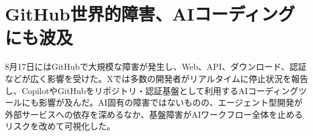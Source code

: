 \section{GitHub世界的障害、AIコーディングにも波及}
8月17日にはGitHubで大規模な障害が発生し、Web、API、ダウンロード、認証などが広く影響を受けた。Xでは多数の開発者がリアルタイムに停止状況を報告し、CopilotやGitHubをリポジトリ・認証基盤として利用するAIコーディングツールにも影響が及んだ。AI固有の障害ではないものの、エージェント型開発が外部サービスへの依存を深めるなか、基盤障害がAIワークフロー全体を止めるリスクを改めて可視化した。
